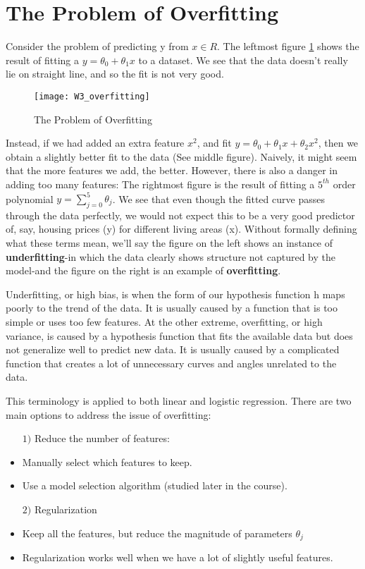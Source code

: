 \section*{The Problem of Overfitting}
Consider the problem of predicting y from $x \in R$. The leftmost figure \ref{fig:w3_overfit} shows the result of fitting a $y=\theta_0 + \theta_1 x$ to a dataset. We see that the data doesn't really lie on straight line, and so the fit is not very good.
\begin{figure}[ht]
\center
\texttt{[image: W3\_overfitting]}
\caption{The Problem of Overfitting}
\label{fig:w3_overfit}
\end{figure}

Instead, if we had added an extra feature $x^2$, and fit $y = \theta_0 + \theta_1x + \theta_2x^2$, then we obtain a slightly better fit to the data (See middle figure). Naively, it might seem that the more features we add, the better. However, there is also a danger in adding too many features: The rightmost figure is the result of fitting a $5^{th}$ order polynomial $y = \sum_{j=0} ^5 \theta_j$. We see that even though the fitted curve passes through the data perfectly, we would not expect this to be a very good predictor of, say, housing prices (y) for different living areas (x). Without formally defining what these terms mean, we'll say the figure on the left shows an instance of {\bf underfitting}-in which the data clearly shows structure not captured by the model-and the figure on the right is an example of {\bf overfitting}.

Underfitting, or high bias, is when the form of our hypothesis function h maps poorly to the trend of the data. It is usually caused by a function that is too simple or uses too few features. At the other extreme, overfitting, or high variance, is caused by a hypothesis function that fits the available data but does not generalize well to predict new data. It is usually caused by a complicated function that creates a lot of unnecessary curves and angles unrelated to the data.

This terminology is applied to both linear and logistic regression. There are two main options to address the issue of overfitting:
\begin{itemize}
	\item[$1)$] Reduce the number of features:
	\item	\quad Manually select which features to keep.
	\item	\quad Use a model selection algorithm (studied later in the course).
	\item[$2)$] Regularization
	\item	\quad Keep all the features, but reduce the magnitude of parameters $\theta_j$
	\item	\quad Regularization works well when we have a lot of slightly useful features.
\end{itemize}